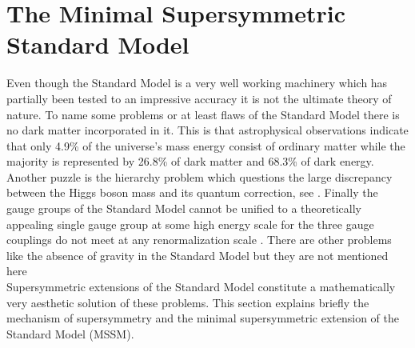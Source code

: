 \section{The Minimal Supersymmetric Standard Model}
Even though the Standard Model is a very well working machinery which has partially been tested to an impressive accuracy it is not the ultimate theory of nature. To name some problems or at least flaws of the Standard Model there is no dark matter incorporated in it. This is that astrophysical observations \cite{Adam:2015rua} indicate that only 4.9\% of the universe's mass energy consist of ordinary matter while the majority is represented by 26.8\% of dark matter and 68.3\% of dark energy. Another puzzle is the hierarchy problem which questions the large discrepancy between the Higgs boson mass and its quantum correction, see \cite{Martin:1997ns}. Finally the gauge groups of the Standard Model cannot be unified to a theoretically appealing single gauge group at some high energy scale for the three gauge couplings do not meet at any renormalization scale \cite{Martin:1997ns}. There are other problems like the absence of gravity in the Standard Model but they are not mentioned here\\
Supersymmetric extensions of the Standard Model constitute a mathematically very aesthetic solution of these problems. This section explains briefly the mechanism of supersymmetry and the minimal supersymmetric extension of the Standard Model (MSSM).

